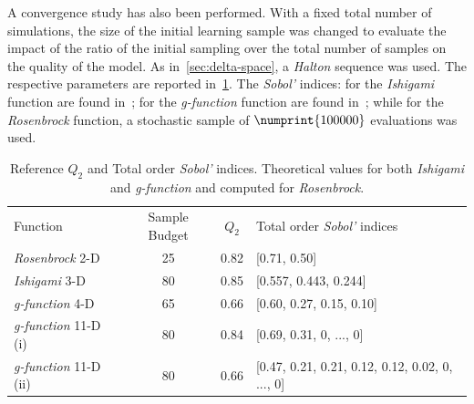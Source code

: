 A convergence study has also been performed. With a fixed total number of simulations, the size of the initial learning sample was changed to evaluate the impact of the ratio of the initial sampling over the total number of samples on the quality of the model. As in~\cref{sec:delta-space}, a \textit{Halton} sequence was used. The respective parameters are reported in~\cref{tab:cv-budget-q2}. The \textit{Sobol'} indices: for the \textit{Ishigami} function are found in~\cite{marrel2012}; for the \textit{g-function} function are found in~\cite{kucherenko2016}; while for the \textit{Rosenbrock} function, a stochastic sample of $\numprint{100000}$ evaluations was used.

\begin{table}
\centering
\begin{tabular}{lccl}
\toprule
Function &Sample Budget & $Q_2$ & Total order \textit{Sobol'} indices \\
\cmidrule{1-3}
\textit{Rosenbrock} 2-D & 25 & 0.82 & [0.71, 0.50]\\
\textit{Ishigami} 3-D & 80 & 0.85 & [0.557, 0.443, 0.244]\\
\textit{g-function} 4-D & 65 & 0.66& [0.60,  0.27,  0.15,  0.10]\\
\textit{g-function} 11-D (i)& 80 & 0.84& [0.69, 0.31, 0, ..., 0]\\
\textit{g-function} 11-D (ii)& 80 & 0.66 & [0.47, 0.21, 0.21, 0.12, 0.12, 0.02, 0, ..., 0]\\
\bottomrule
\end{tabular}
\caption{Reference $Q_2$ and Total order \textit{Sobol'} indices. Theoretical values for both \emph{Ishigami} and \emph{g-function} and computed for \emph{Rosenbrock}.}
\label{tab:cv-budget-q2}
\end{table}

